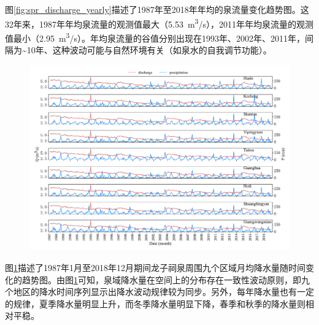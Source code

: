 图\ref{fig:spr_discharge_yearly}描述了1987年至2018年年均的泉流量变化趋势图。这32年来，1987年年均泉流量的观测值最大（\SI{5.53}{m^{3}/s}），2011年年均泉流量的观测值最小（\SI{2.95}{m^{3}/s}）。年均泉流量的谷值分别出现在1993年、2002年、2011年，间隔为\sim 10年、这种波动可能与自然环境有关（如泉水的自我调节功能）。

\begin{figure}[!htbp]
  \vspace{-0.35cm}
  \centering
  \includegraphics[width=\textwidth]{Img/chap4_spr/spr_precipitation_monthly}
  \vspace{-1cm}
  \label{fig:spr_precipitation_monthly}
\end{figure}

图\ref{fig:spr_precipitation_monthly}描述了1987年1月至2018年12月期间龙子祠泉周围九个区域月均降水量随时间变化的趋势图。由图\ref{fig:spr_precipitation_monthly}可知，泉域降水量在空间上的分布存在一致性波动原则，即九个地区的降水时间序列显示出降水波动规律较为同步。另外，每年降水量也有一定的规律，夏季降水量明显上升，而冬季降水量明显下降，春季和秋季的降水量则相对平稳。

